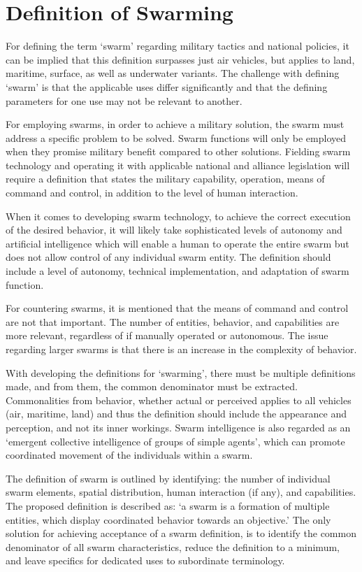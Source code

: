 \section*{Definition of Swarming}
For defining the term ‘swarm’ regarding military tactics and national policies, it can be implied that this definition surpasses just air vehicles, but applies to land, maritime, surface, as well as underwater variants.  The challenge with defining ‘swarm’ is that the applicable uses differ significantly and that the defining parameters for one use may not be relevant to another.  

For employing swarms, in order to achieve a military solution, the swarm must address a specific problem to be solved. Swarm functions will only be employed when they promise military benefit compared to other solutions.  Fielding swarm technology and operating it with applicable national and alliance legislation will require a definition that states the military capability, operation, means of command and control, in addition to the level of human interaction.  

When it comes to developing swarm technology, to achieve the correct execution of the desired behavior, it will likely take sophisticated levels of autonomy and artificial intelligence which will enable a human to operate the entire swarm but does not allow control of any individual swarm entity. The definition should include a level of autonomy, technical implementation, and adaptation of swarm function.  

For countering swarms, it is mentioned that the means of command and control are not that important. The number of entities, behavior, and capabilities are more relevant, regardless of if manually operated or autonomous. The issue regarding larger swarms is that there is an increase in the complexity of behavior.  

With developing the definitions for ‘swarming’, there must be multiple definitions made, and from them, the common denominator must be extracted. Commonalities from behavior, whether actual or perceived applies to all vehicles (air, maritime, land) and thus the definition should include the appearance and perception, and not its inner workings. Swarm intelligence is also regarded as an ‘emergent collective intelligence of groups of simple agents’, which can promote coordinated movement of the individuals within a swarm. 

The definition of swarm is outlined by identifying: the number of individual swarm elements, spatial distribution, human interaction (if any), and capabilities. The proposed definition is described as: ‘a swarm is a formation of multiple entities, which display coordinated behavior towards an objective.’ The only solution for achieving acceptance of a swarm definition, is to identify the common denominator of all swarm characteristics, reduce the definition to a minimum, and leave specifics for dedicated uses to subordinate terminology. 

